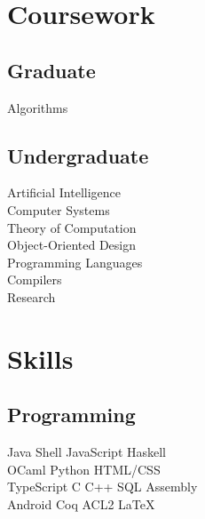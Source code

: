 \documentclass[letterpaper]{resume} %
\begin{document}
\begin{minipage}[t]{0.33\textwidth}
\section{Coursework}
\subsection{Graduate}
Algorithms
\sectionspace %

\subsection{Undergraduate}
Artificial Intelligence \\
Computer Systems \\
Theory of Computation \\
Object-Oriented Design \\
Programming Languages \\
Compilers \\
Research
\sectionspace %


\section{Skills}

\subsection{Programming}

Java \textbullet{} Shell \textbullet{} JavaScript \textbullet{} Haskell \\
OCaml \textbullet{} Python \textbullet{} HTML/CSS \\

TypeScript \textbullet{}  C \textbullet{} C++ \textbullet{} SQL \textbullet{} Assembly \\

Android  \textbullet{} Coq \textbullet{} ACL2 \textbullet{} \LaTeX\ \\

\sectionspace %


\end{minipage}
\end{document}
